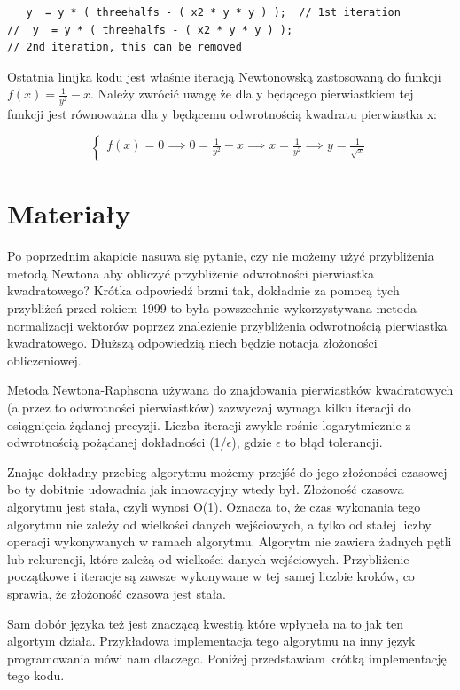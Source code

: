 \documentclass[12pt]{article}
\begin{document}
\begin{lstlisting}
   y  = y * ( threehalfs - ( x2 * y * y ) );  // 1st iteration
//	y  = y * ( threehalfs - ( x2 * y * y ) );  
// 2nd iteration, this can be removed
\end{lstlisting}

Ostatnia linijka kodu jest właśnie iteracją Newtonowską zastosowaną do funkcji $f(x) = \frac{1}{y^2} - x$. Należy zwrócić uwagę że dla y będącego pierwiastkiem tej funkcji jest równoważna dla y będącemu odwrotnością kwadratu pierwiastka x:

$$ \begin{cases}
f(x) = 0 \implies 0 = \frac{1}{y^2} - x \implies x = \frac{1}{y^2} \implies y = \frac{1}{\sqrt{x}}
\end{cases} $$

\section{Materiały}
Po poprzednim akapicie nasuwa się pytanie, czy nie możemy użyć przybliżenia metodą Newtona aby obliczyć przybliżenie odwrotności pierwiastka kwadratowego? Krótka odpowiedź brzmi tak, dokładnie za pomocą tych przybliżeń przed rokiem 1999 to była powszechnie wykorzystywana metoda normalizacji wektorów poprzez znalezienie przybliżenia odwrotnością pierwiastka kwadratowego. Dłuższą odpowiedzią niech będzie notacja złożoności obliczeniowej. 

Metoda Newtona-Raphsona używana do znajdowania pierwiastków kwadratowych (a przez to odwrotności pierwiastków) zazwyczaj wymaga kilku iteracji do osiągnięcia żądanej precyzji. Liczba iteracji zwykle rośnie logarytmicznie z odwrotnością pożądanej dokładności (1/$\epsilon$), gdzie $\epsilon$ to błąd tolerancji. 

Znając dokładny przebieg algorytmu możemy przejść do jego złożoności czasowej bo ty dobitnie udowadnia jak innowacyjny wtedy był. Złożoność czasowa algorytmu jest stała, czyli wynosi O(1). Oznacza to, że czas wykonania tego algorytmu nie zależy od wielkości danych wejściowych, a tylko od stałej liczby operacji wykonywanych w ramach algorytmu. Algorytm nie zawiera żadnych pętli lub rekurencji, które zależą od wielkości danych wejściowych. Przybliżenie początkowe i iteracje są zawsze wykonywane w tej samej liczbie kroków, co sprawia, że złożoność czasowa jest stała.

Sam dobór języka też jest znaczącą kwestią które wpłyneła na to jak ten algortym działa. Przykładowa implementacja tego algorytmu na inny język programowania mówi nam dlaczego. Poniżej przedstawiam krótką implementację tego kodu.
\end{document}
